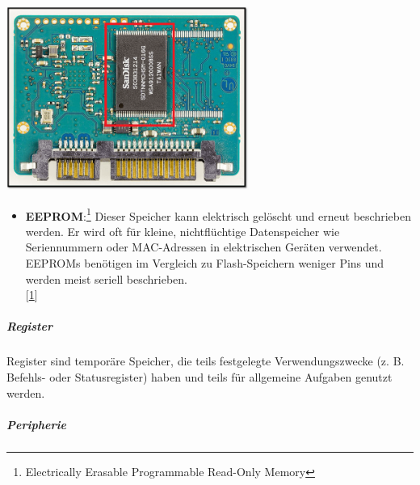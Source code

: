 \documentclass[
    headings=optiontotocandhead,%
    twoside,
    numbers=noenddot,%
    12pt, %
    titlepage, %
    parskip=full, %
    listof=leveldown, 
    numbers=noenddot, %
    a4paper,DIV=14,
    BCOR=15mm,
]{scrbook}
\let\origfigure=\figure
\let\endorigfigure=\endfigure
\renewenvironment{figure}[1][]{%
   \origfigure[H]
}{%
   \endorigfigure
}
\providecommand{\tightlist}{%
  \setlength{\itemsep}{0pt}\setlength{\parskip}{0pt}}
\begin{document}
\begin{figure}
\centering
\includegraphics[width=3.125in,height=\textheight]{img/Kampl/Flash.png}
\caption{FLASH {[}\protect\hyperlink{ref-FLASH}{8}{]}}
\end{figure}

\begin{itemize}
\tightlist
\item
  \textbf{EEPROM}:\footnote{Electrically Erasable Programmable Read-Only
    Memory} Dieser Speicher kann elektrisch gelöscht und erneut
  beschrieben werden. Er wird oft für kleine, nichtflüchtige
  Datenspeicher wie Seriennummern oder MAC-Adressen in elektrischen
  Geräten verwendet. EEPROMs benötigen im Vergleich zu Flash-Speichern
  weniger Pins und werden meist seriell beschrieben.\\
  {[}\protect\hyperlink{ref-EmbeddedSystems}{1}{]}
\end{itemize}

\hypertarget{register}{%
\subparagraph{Register}\label{register}}

Register sind temporäre Speicher, die teils festgelegte
Verwendungszwecke (z. B. Befehls- oder Statusregister) haben und teils
für allgemeine Aufgaben genutzt werden.

\hypertarget{peripherie}{%
\subparagraph{Peripherie}\label{peripherie}}
\end{document}

